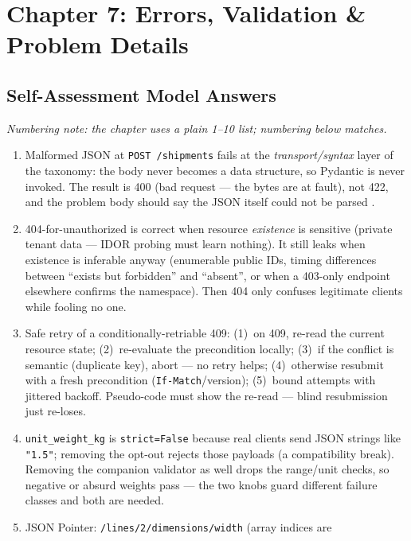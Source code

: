 \section{Chapter 7: Errors, Validation \& Problem Details}
\label{sec:sol-ch7}

\subsection{Self-Assessment Model Answers}

\emph{Numbering note: the chapter uses a plain 1--10 list; numbering below
matches.}

\begin{enumerate}[leftmargin=2.2em]
  \item Malformed JSON at \texttt{POST /shipments} fails at the
    \emph{transport/syntax} layer of the taxonomy: the body never becomes a
    data structure, so Pydantic is never invoked. The result is 400 (bad
    request --- the bytes are at fault), not 422, and the problem body
    should say the JSON itself could not be parsed \cite{rfc9457}.
  \item 404-for-unauthorized is correct when resource \emph{existence} is
    sensitive (private tenant data --- IDOR probing must learn nothing). It
    still leaks when existence is inferable anyway (enumerable public IDs,
    timing differences between ``exists but forbidden'' and ``absent'', or
    when a 403-only endpoint elsewhere confirms the namespace). Then 404
    only confuses legitimate clients while fooling no one.
  \item Safe retry of a conditionally-retriable 409: (1)~on 409, re-read the
    current resource state; (2)~re-evaluate the precondition locally;
    (3)~if the conflict is semantic (duplicate key), abort --- no retry
    helps; (4)~otherwise resubmit with a fresh precondition
    (\texttt{If-Match}/version); (5)~bound attempts with jittered backoff.
    Pseudo-code must show the re-read --- blind resubmission just re-loses.
  \item \texttt{unit\_weight\_kg} is \texttt{strict=False} because real
    clients send JSON strings like \texttt{"1.5"}; removing the opt-out
    rejects those payloads (a compatibility break). Removing the companion
    validator as well drops the range/unit checks, so negative or absurd
    weights pass --- the two knobs guard different failure classes and both
    are needed.
  \item JSON Pointer: \texttt{/lines/2/dimensions/width} (array indices are

\end{enumerate}
